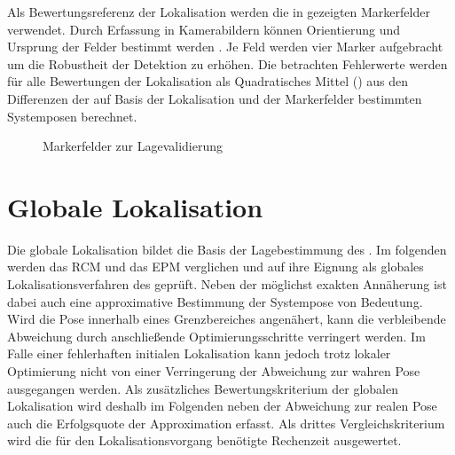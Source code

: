 Als Bewertungsreferenz der Lokalisation werden die in  gezeigten Markerfelder verwendet. Durch Erfassung in Kamerabildern können Orientierung und Ursprung der Felder bestimmt werden \cite{arsys}. Je Feld werden vier Marker aufgebracht um die Robustheit der Detektion zu erhöhen. Die betrachten Fehlerwerte werden für alle Bewertungen der Lokalisation als Quadratisches Mittel ()  aus den Differenzen der auf Basis der Lokalisation und der Markerfelder bestimmten Systemposen berechnet.\\

\begin{figure}[!ht]
	\begin{center}
	\hspace{5mm}
	\caption{Markerfelder zur Lagevalidierung}
	\label{fig.armarker}
	\end{center}
	\vspace*{-2mm}
\end{figure}%


%


\section{Globale Lokalisation}
Die globale Lokalisation bildet die Basis der Lagebestimmung des . Im folgenden werden das RCM und das EPM verglichen und auf ihre Eignung als globales Lokalisationsverfahren des  geprüft. Neben der möglichst exakten Annäherung ist dabei auch eine approximative Bestimmung der Systempose von Bedeutung. Wird die Pose innerhalb eines Grenzbereiches angenähert, kann die verbleibende Abweichung durch anschließende Optimierungsschritte verringert werden. Im Falle einer fehlerhaften initialen Lokalisation kann jedoch trotz lokaler Optimierung nicht von einer Verringerung der Abweichung zur wahren Pose ausgegangen werden. Als zusätzliches Bewertungskriterium der globalen Lokalisation wird deshalb im Folgenden neben der Abweichung zur realen Pose auch die Erfolgsquote der Approximation erfasst. Als drittes Vergleichskriterium wird die für den Lokalisationsvorgang benötigte Rechenzeit ausgewertet.\\

